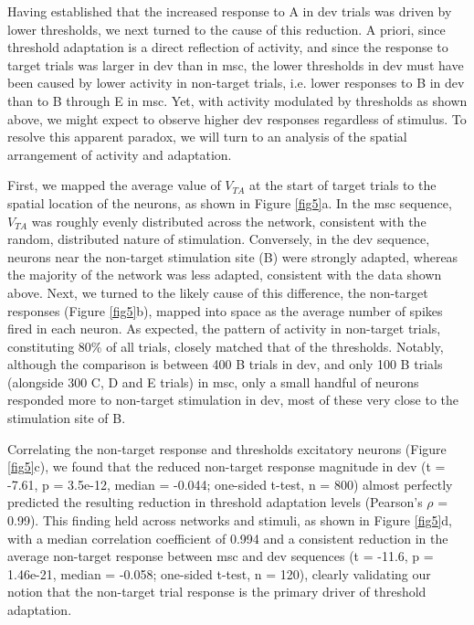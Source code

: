 \documentclass[pdflatex,referee,iicol,sn-basic]{sn-jnl}
\theoremstyle{thmstyleone}%
\theoremstyle{thmstyletwo}%
\theoremstyle{thmstylethree}%
\begin{document}
Having established that the increased response to A in dev trials was driven by lower thresholds, we next turned to the cause of this reduction. A priori, since threshold adaptation is a direct reflection of activity, and since the response to target trials was larger in dev than in msc, the lower thresholds in dev must have been caused by lower activity in non-target trials, i.e. lower responses to B in dev than to B through E in msc. Yet, with activity modulated by thresholds as shown above, we might expect to observe higher dev responses regardless of stimulus. To resolve this apparent paradox, we will turn to an analysis of the spatial arrangement of activity and adaptation.

First, we mapped the average value of $V_{TA}$ at the start of target trials to the spatial location of the neurons, as shown in Figure \ref{fig5}a. In the msc sequence, $V_{TA}$ was roughly evenly distributed across the network, consistent with the random, distributed nature of stimulation. Conversely, in the dev sequence, neurons near the non-target stimulation site (B) were strongly adapted, whereas the majority of the network was less adapted, consistent with the data shown above.
Next, we turned to the likely cause of this difference, the non-target responses (Figure \ref{fig5}b), mapped into space as the average number of spikes fired in each neuron. As expected, the pattern of activity in non-target trials, constituting 80\% of all trials, closely matched that of the thresholds. Notably, although the comparison is between 400 B trials in dev, and only 100 B trials (alongside 300 C, D and E trials) in msc, only a small handful of neurons responded more to non-target stimulation in dev, most of these very close to the stimulation site of B.

Correlating the non-target response and thresholds excitatory neurons (Figure \ref{fig5}c), we found that the reduced non-target response magnitude in dev (t = -7.61, p = 3.5e-12, median = -0.044; one-sided t-test, n = 800) almost perfectly predicted the resulting reduction in threshold adaptation levels (Pearson's $\rho$ = 0.99).
This finding held across networks and stimuli, as shown in Figure \ref{fig5}d, with a median correlation coefficient of 0.994 and a consistent reduction in the average non-target response between msc and dev sequences (t = -11.6, p = 1.46e-21, median = -0.058; one-sided t-test, n = 120), clearly validating our notion that the non-target trial response is the primary driver of threshold adaptation.
\end{document}
